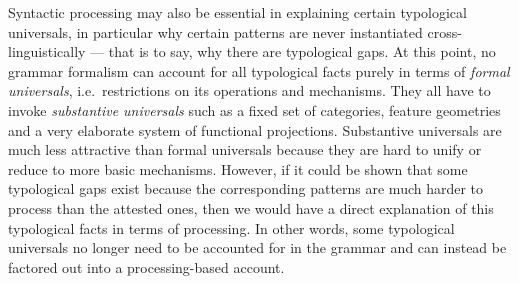 Syntactic processing may also be essential in explaining certain typological universals, in particular why certain patterns are never instantiated cross-linguistically --- that is to say, why there are typological gaps.
At this point, no grammar formalism can account for all typological facts purely in terms of \emph{formal universals}, i.e.\ restrictions on its operations and mechanisms.
They all have to invoke \emph{substantive universals} such as a fixed set of categories, feature geometries and a very elaborate system of functional projections.
Substantive universals are much less attractive than formal universals because they are hard to unify or reduce to more basic mechanisms.
However, if it could be shown that some typological gaps exist because the corresponding patterns are much harder to process than the attested ones, then we would have a direct explanation of this typological facts in terms of processing.
In other words, some typological universals no longer need to be accounted for in the grammar and can instead be factored out into a processing-based account.







